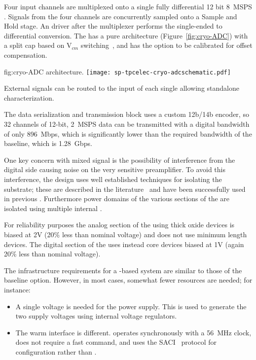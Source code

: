 Four input channels are multiplexed onto a single fully differential 12 bit \SI{8}{MSPS} 
. Signals from the four channels are concurrently sampled onto a Sample and Hold 
stage. An  driver after the multiplexer performs the single-ended to differential 
conversion. The  has a pure  architecture (Figure~\ref{fig:cryo-ADC}) with a split 
cap  based on V$_{cm}$ switching~\cite{5482529}, and has the option to be 
calibrated for offset compensation.

\begin{dunefigure}
{fig:cryo-ADC}
{  architecture.}
\texttt{[image: sp-tpcelec-cryo-adcschematic.pdf]}
\end{dunefigure}

External signals can be routed to the input of each single  allowing standalone characterization.

The data serialization and transmission block uses a custom 12b/14b encoder, so 32 channels 
of 12-bit, \SI{2}{MSPS} data can be transmitted with a digital bandwidth of only \SI{896}{Mbps}, 
which is significantly lower than the required bandwidth of the baseline, which is \SI{1.28}{Gbps}.

One key concern with mixed signal  is the possibility of interference from the 
digital side causing noise on the very sensitive preamplifier. To avoid this interference, 
the  design uses well established techniques for isolating the substrate;
these are described in the literature~\cite{yeh} and have been successfully used in previous 
. Furthermore power domains of the various sections of the  are 
isolated using multiple internal .

For reliability purposes the analog section of the  using thick oxide devices 
is biased at 2V (20\% less than nominal voltage) and does not use minimum length devices.
The digital section of the  uses instead core devices biased at 1V (again 20\% 
less than nominal voltage).

The infrastructure requirements for a  -based system are similar 
to those of the baseline option. However, in most cases, somewhat fewer resources are 
needed; for instance:
\begin{itemize}
\item A single voltage is needed for the power supply. This is used to generate the two 
supply voltages using internal voltage regulators.
\item The warm interface is different.  operates synchronously
with a \SI{56}{MHz} clock, does not require a fast command, and uses the 
SACI~\cite{SACI} protocol for configuration rather than .
\end{itemize}

